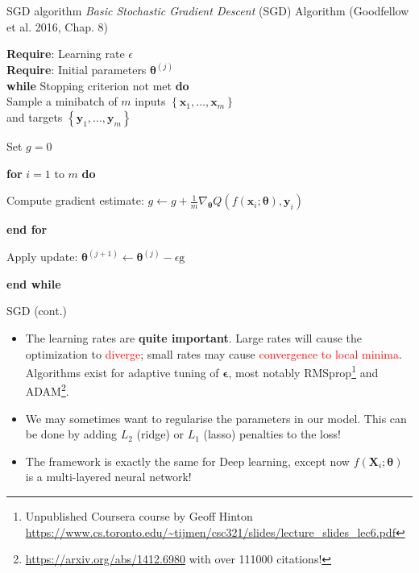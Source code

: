 \documentclass{beamer}
\begin{document}
\begin{frame}{SGD algorithm}
\textit{Basic Stochastic Gradient Descent} (SGD) Algorithm (Goodfellow et al. 2016, Chap. 8)

\textbf{Require}: Learning rate $\epsilon$\\
\textbf{Require}: Initial parameters $\boldsymbol{\theta}^{(j)}$\\
\;\;\;\;\textbf{while} Stopping criterion not met \textbf{do}\\
\;\;\;\;\;\;Sample a minibatch of $m$ inputs $\left\{\mathbf{x}_{1}, \ldots, \mathbf{x}_{m}\right\}$\\
\;\;\;\;\;\;\;\;and targets $\left\{\mathbf{y}_{1}, \ldots, \mathbf{y}_{m}\right\}$

\;\;\;\;\;\;Set $g=0$

\;\;\;\;\;\;\textbf{for} $i=1$ to $m$ \textbf{do}

\;\;\;\;\;\;\;\;Compute gradient estimate: $g \leftarrow g+\frac{1}{m} \nabla_{\boldsymbol{\theta}} Q\left(f\left(\mathbf{x}_{i} ; \boldsymbol{\theta}\right), \mathbf{y}_{i}\right)$

\;\;\;\;\;\;\textbf{end for}

\;\;\;\;\;\;Apply update: $\boldsymbol{\theta}^{(j+1)} \leftarrow \boldsymbol{\theta}^{(j)}-\epsilon \mathrm{g}$

\;\;\;\;\textbf{end while}
\end{frame}

\begin{frame}{SGD (cont.)}
\begin{itemize}
\item The learning rates are \textbf{quite important}. Large rates will cause the optimization to \textcolor{red}{diverge}; small rates may cause \textcolor{red}{convergence to local minima}. Algorithms exist for adaptive tuning of $\boldsymbol{\epsilon}$, most notably RMSprop\footnote{Unpublished Coursera course by Geoff Hinton \url{https://www.cs.toronto.edu/~tijmen/csc321/slides/lecture_slides_lec6.pdf}} and ADAM\footnote{\url{https://arxiv.org/abs/1412.6980} with over 111000 citations!}.
\item We may sometimes want to regularise the parameters in our model. This can be done by adding $L_2$ (ridge) or $L_1$ (lasso) penalties to the loss!
\item The framework is exactly the same for Deep learning, except now $f(\mathbf{X}_i; \boldsymbol{\theta})$ is a multi-layered neural network!
\end{itemize} 
\end{frame}
\end{document}
